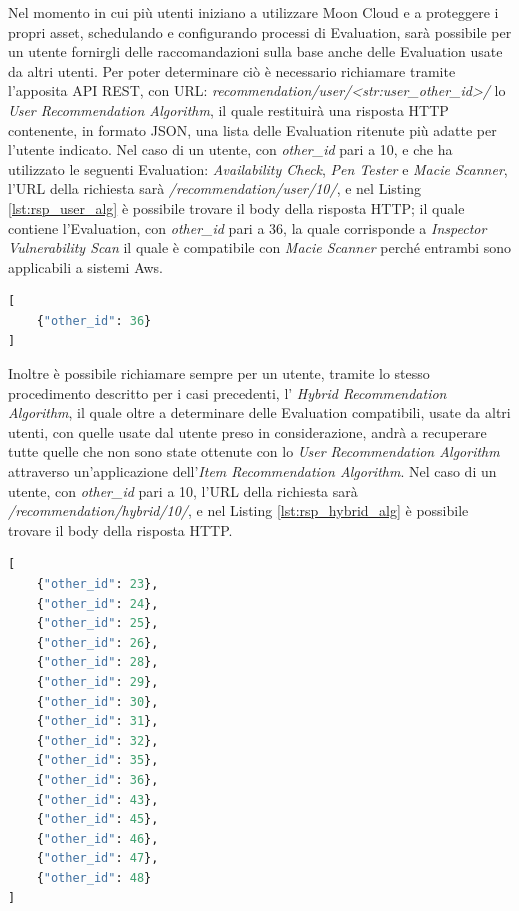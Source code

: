 Nel momento in cui più utenti iniziano a utilizzare Moon Cloud e a proteggere i propri asset, schedulando e configurando 
processi di Evaluation, sarà possibile per un utente fornirgli delle raccomandazioni sulla base anche delle Evaluation usate da 
altri utenti. Per poter determinare ciò è necessario richiamare tramite l'apposita API REST, con URL: 
\textit{recommendation/user/<str:user\_other\_id>/} lo \textit{User Recommendation Algorithm}, il quale restituirà una 
risposta HTTP contenente, in formato JSON, una lista delle Evaluation ritenute più adatte per l'utente indicato. 
Nel caso di un utente, con \textit{other\_id} pari a 10, e che ha utilizzato le seguenti Evaluation: \textit{Availability Check},
\textit{Pen Tester} e \textit{Macie Scanner}, l'URL della richiesta sarà 
\textit{/recommendation/user/10/}, e nel Listing \ref{lst:rsp_user_alg} è possibile trovare il body della risposta HTTP; il quale 
contiene l'Evaluation, con \textit{other\_id} pari a 36, la quale corrisponde a \textit{Inspector Vulnerability Scan} il quale 
è compatibile con \textit{Macie Scanner} perché entrambi sono applicabili a sistemi Aws.
\begin{lstlisting}[language=Python, label=lst:rsp_user_alg, caption={Esempio di risposta HTTP alla chiamata del 
    \textit{User Recommendation Algorithm}}]
[
    {"other_id": 36}
]
\end{lstlisting}
Inoltre è possibile richiamare sempre per un utente, tramite lo stesso procedimento descritto per i casi precedenti, 
l' \textit{Hybrid Recommendation Algorithm}, il quale oltre a determinare delle Evaluation compatibili, usate da altri 
utenti, con quelle usate dal utente preso in considerazione, andrà a recuperare tutte quelle che non sono state ottenute con lo
\textit{User Recommendation Algorithm} attraverso un'applicazione dell'\textit{Item Recommendation Algorithm}. Nel caso di 
un utente, con \textit{other\_id} pari a 10, l'URL della richiesta sarà 
\textit{/recommendation/hybrid/10/}, e nel Listing \ref{lst:rsp_hybrid_alg} è possibile trovare il body della risposta HTTP.
\begin{lstlisting}[language=Python, label=lst:rsp_hybrid_alg, caption={Esempio di risposta HTTP alla chiamata del 
    \textit{Hybrid Recommendation Algorithm}}]
[
    {"other_id": 23},
    {"other_id": 24},
    {"other_id": 25},
    {"other_id": 26},
    {"other_id": 28},
    {"other_id": 29},
    {"other_id": 30},
    {"other_id": 31},
    {"other_id": 32},
    {"other_id": 35},
    {"other_id": 36},
    {"other_id": 43},
    {"other_id": 45},
    {"other_id": 46},
    {"other_id": 47},
    {"other_id": 48}
]
\end{lstlisting}


